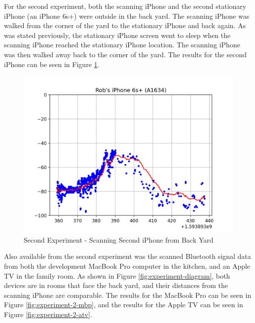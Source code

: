 \documentclass[12pt]{article}
\begin{document}
For the second experiment, both the scanning iPhone and the second stationary iPhone
(an iPhone 6s+) were outside in the back yard. The scanning iPhone was walked from the
corner of the yard to the stationary iPhone and back again. As was stated previously,
the stationary iPhone screen went to sleep when the scanning iPhone reached the stationary
iPhone location. The scanning iPhone was then walked away back to the corner of the yard.
The results for the second iPhone can be seen in Figure \ref{fig:experiment-2-iphone}.

\begin{figure}[ht]
    \centering
    \includegraphics[width=1.0\textwidth]{Experiment-2-iPhone.png}
    \caption{Second Experiment - Scanning Second iPhone from Back Yard}
    \label{fig:experiment-2-iphone}
\end{figure}

Also available from the second experiment was the scanned Bluetooth signal data from both
the development MacBook Pro computer in the kitchen, and an Apple TV in the family room.
As shown in Figure \ref{fig:experiment-diagram}, both devices are in rooms that face the
back yard, and their distances from the scanning iPhone are comparable. The results for
the MacBook Pro can be seen in Figure \ref{fig:experiment-2-mbp}, and the results for the
Apple TV can be seen in Figure \ref{fig:experiment-2-atv}.
\end{document}
